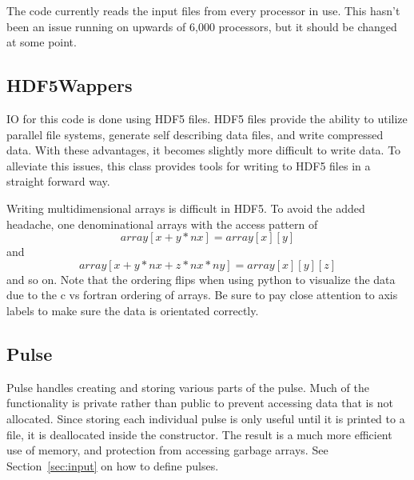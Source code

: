 \documentclass{article}
\begin{document}
The code currently reads the input files from every processor in use. This hasn't been an issue running on upwards of 6,000 processors, but it should be changed at some point.


\subsection{HDF5Wappers} %
\label{sub:hdf5wappers}
IO for this code is done using HDF5 files. HDF5 files provide the ability to utilize parallel file systems, generate self describing data files, and write compressed data. With these advantages, it becomes slightly more difficult to write data. To alleviate this issues, this class provides tools for writing to HDF5 files in a straight forward way.

Writing multidimensional arrays is difficult in HDF5. To avoid the added headache, one denominational arrays with the access pattern of
\begin{equation}
	array[x+y*nx] = array[x][y]
\end{equation}
and
\begin{equation}
	array[x+y*nx+z*nx*ny] = array[x][y][z]
\end{equation}
and so on. Note that the ordering flips when using python to visualize the data due to the c vs fortran ordering of arrays. Be sure to pay close attention to axis labels to make sure the data is orientated correctly.

\subsection{Pulse} %
\label{sub:pulse}
Pulse handles creating and storing various parts of the pulse. Much of the functionality is private rather than public to prevent accessing data that is not allocated. Since storing each individual pulse is only useful until it is printed to a file, it is deallocated inside the constructor. The result is a much more efficient use of memory, and protection from accessing garbage arrays. See Section~\ref{sec:input} on how to define pulses.
\end{document}

